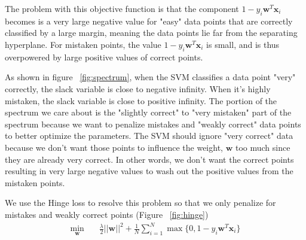 \documentclass[11pt]{article}
\begin{document}
The problem with this objective function is that the component $1 - y_i \mathbf{w}^T \mathbf{x}_i$ becomes is a very large negative value for "easy" data points that are correctly classified by a large margin, meaning the data points lie far from the separating hyperplane. For mistaken points, the value $1 - y_i \mathbf{w}^T \mathbf{x}_i$ is small, and is thus overpowered by large positive values of correct points.



As shown in figure ~\ref{fig:spectrum}, when the SVM classifies a data point "very" correctly, the slack variable is close to negative infinity. When it's highly mistaken, the slack variable is close to positive infinity. 
The portion of the spectrum we care about is the "slightly correct" to "very mistaken" part of the spectrum because we want to penalize mistakes and "weakly correct" data points to better optimize the parameters. The SVM should ignore "very correct" data because we don't want those points to influence the weight, $\mathbf{w}$ too much since they are already very correct. In other words, we don't want the correct points resulting in very large negative values to wash out the positive values from the mistaken points.

We use the Hinge loss to resolve this problem so that we only penalize for mistakes and weakly correct points (Figure ~\ref{fig:hinge})
\begin{equation}
\begin{aligned}
\min_{\mathbf{w}} \quad & \frac{\lambda}{2}||\mathbf{w}||^2 + \frac{1}{N}\sum_{i=1}^N \max\{0, 1 - y_i \mathbf{w}^T \mathbf{x}_i\} \\
\end{aligned}
\end{equation}

\end{document}
